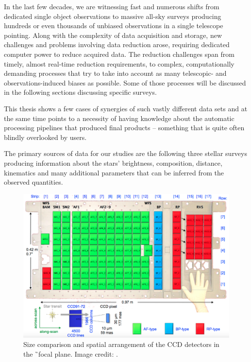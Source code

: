 In the last few decades, we are witnessing fast and numerous shifts from dedicated single object observations to massive all-sky surveys producing hundreds or even thousands of unbiased observations in a single telescope pointing. Along with the complexity of data acquisition and storage, new challenges and problems involving data reduction arose, requiring dedicated computer power to reduce acquired data. The reduction challenges span from timely, almost real-time reduction requirements, to complex, computationally demanding processes that try to take into account as many telescopic- and observations-induced biases as possible. Some of those processes will be discussed in the following sections discussing specific surveys.

This thesis shows a few cases of synergies of such vastly different data sets and at the same time points to a necessity of having knowledge about the automatic processing pipelines that produced final products -- something that is quite often blindly overlooked by users.

The primary sources of data for our studies are the following three stellar surveys producing information about the stars' brightness, composition, distance, kinematics and many additional parameters that can be inferred from the observed quantities.

\begin{figure}
	\centering
	\includegraphics[width=\columnwidth]{gaia_ccd.png}
	\caption{Size comparison and spatial arrangement of the CCD detectors in the \G\ focal plane. Image credit: \citet{2016A&A...595A...1G}.}
	\label{fig:gaia_ccd}
\end{figure}

